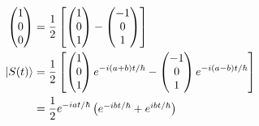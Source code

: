 \documentclass{article}
\begin{document}
\begin{enumerate}
        \begin{align*}
          \begin{pmatrix}
            1 \\
            0 \\
            0
          \end{pmatrix} & = \frac{1}{2} \left[ \begin{pmatrix}
                                                   1 \\
                                                   0 \\
                                                   1
                                                 \end{pmatrix} - \begin{pmatrix}
                                                                   -1 \\
                                                                   0  \\
                                                                   1
                                                                 \end{pmatrix} \right]                                                     \\
          \ket{S(t)}      & = \frac{1}{2} \left[ \begin{pmatrix}
                                                     1 \\
                                                     0 \\
                                                     1
                                                   \end{pmatrix} e^{-i (a + b) t / \hbar} - \begin{pmatrix}
                                                                                              -1 \\
                                                                                              0  \\
                                                                                              1
                                                                                            \end{pmatrix} e^{-i (a - b) t / \hbar} \right] \\
                          & = \frac{1}{2} e^{-i a t / \hbar} \begin{pmatrix}
                                                               e^{-i b t / \hbar} + e^{i b t / \hbar} \\

\end{pmatrix}
\end{align*}
\end{enumerate}
\end{document}
